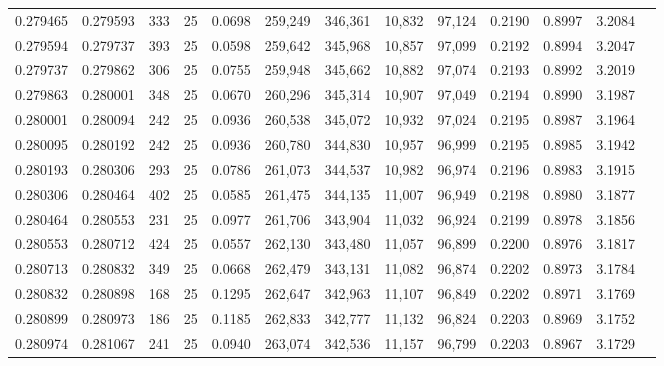 \begin{tabular}{rrrrrrrrrrrrr}
0.279465 & 0.279593 &   333 &  25 &                                     0.0698 & 259,249 & 346,361 &  10,832 &  97,124 & 0.2190 & 0.8997 & 3.2084 \\
0.279594 & 0.279737 &   393 &  25 &                                     0.0598 & 259,642 & 345,968 &  10,857 &  97,099 & 0.2192 & 0.8994 & 3.2047 \\
0.279737 & 0.279862 &   306 &  25 &                                     0.0755 & 259,948 & 345,662 &  10,882 &  97,074 & 0.2193 & 0.8992 & 3.2019 \\
0.279863 & 0.280001 &   348 &  25 &                                     0.0670 & 260,296 & 345,314 &  10,907 &  97,049 & 0.2194 & 0.8990 & 3.1987 \\
0.280001 & 0.280094 &   242 &  25 &                                     0.0936 & 260,538 & 345,072 &  10,932 &  97,024 & 0.2195 & 0.8987 & 3.1964 \\
0.280095 & 0.280192 &   242 &  25 &                                     0.0936 & 260,780 & 344,830 &  10,957 &  96,999 & 0.2195 & 0.8985 & 3.1942 \\
0.280193 & 0.280306 &   293 &  25 &                                     0.0786 & 261,073 & 344,537 &  10,982 &  96,974 & 0.2196 & 0.8983 & 3.1915 \\
0.280306 & 0.280464 &   402 &  25 &                                     0.0585 & 261,475 & 344,135 &  11,007 &  96,949 & 0.2198 & 0.8980 & 3.1877 \\
0.280464 & 0.280553 &   231 &  25 &                                     0.0977 & 261,706 & 343,904 &  11,032 &  96,924 & 0.2199 & 0.8978 & 3.1856 \\
0.280553 & 0.280712 &   424 &  25 &                                     0.0557 & 262,130 & 343,480 &  11,057 &  96,899 & 0.2200 & 0.8976 & 3.1817 \\
0.280713 & 0.280832 &   349 &  25 &                                     0.0668 & 262,479 & 343,131 &  11,082 &  96,874 & 0.2202 & 0.8973 & 3.1784 \\
0.280832 & 0.280898 &   168 &  25 &                                     0.1295 & 262,647 & 342,963 &  11,107 &  96,849 & 0.2202 & 0.8971 & 3.1769 \\
0.280899 & 0.280973 &   186 &  25 &                                     0.1185 & 262,833 & 342,777 &  11,132 &  96,824 & 0.2203 & 0.8969 & 3.1752 \\
0.280974 & 0.281067 &   241 &  25 &                                     0.0940 & 263,074 & 342,536 &  11,157 &  96,799 & 0.2203 & 0.8967 & 3.1729 \\

\end{tabular}
